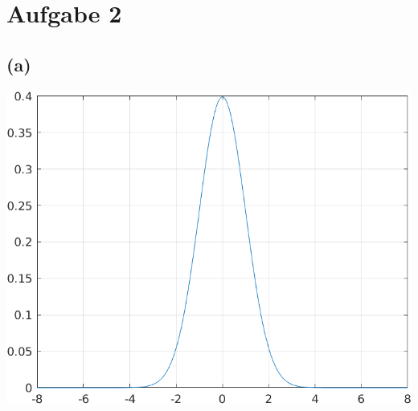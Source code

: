 \documentclass[a4paper]{scrartcl}
\begin{document}
\newpage

\section*{Aufgabe 2}
\subsection*{(a)}
\begin{center}
	\includegraphics*[scale = 0.5]{question2a.png}
\end{center}
\end{document}
